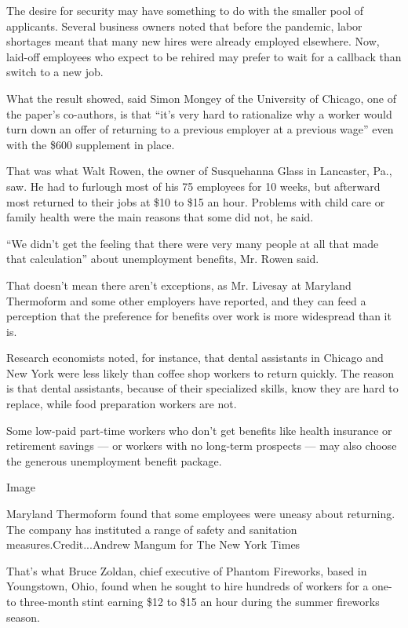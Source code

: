 The desire for security may have something to do with the smaller pool
of applicants. Several business owners noted that before the pandemic,
labor shortages meant that many new hires were already employed
elsewhere. Now, laid-off employees who expect to be rehired may prefer
to wait for a callback than switch to a new job.

What the result showed, said Simon Mongey of the University of Chicago,
one of the paper's co-authors, is that ``it's very hard to rationalize
why a worker would turn down an offer of returning to a previous
employer at a previous wage'' even with the \$600 supplement in place.

That was what Walt Rowen, the owner of Susquehanna Glass in Lancaster,
Pa., saw. He had to furlough most of his 75 employees for 10 weeks, but
afterward most returned to their jobs at \$10 to \$15 an hour. Problems
with child care or family health were the main reasons that some did
not, he said.

``We didn't get the feeling that there were very many people at all that
made that calculation'' about unemployment benefits, Mr. Rowen said.

That doesn't mean there aren't exceptions, as Mr. Livesay at Maryland
Thermoform and some other employers have reported, and they can feed a
perception that the preference for benefits over work is more widespread
than it is.

Research economists noted, for instance, that dental assistants in
Chicago and New York were less likely than coffee shop workers to return
quickly. The reason is that dental assistants, because of their
specialized skills, know they are hard to replace, while food
preparation workers are not.

Some low-paid part-time workers who don't get benefits like health
insurance or retirement savings --- or workers with no long-term
prospects --- may also choose the generous unemployment benefit package.

Image

Maryland Thermoform found that some employees were uneasy about
returning. The company has instituted a range of safety and sanitation
measures.Credit...Andrew Mangum for The New York Times

That's what Bruce Zoldan, chief executive of Phantom Fireworks, based in
Youngstown, Ohio, found when he sought to hire hundreds of workers for a
one- to three-month stint earning \$12 to \$15 an hour during the summer
fireworks season.

